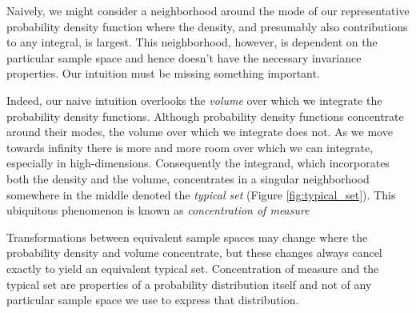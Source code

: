 Naively, we might consider a neighborhood around the mode of our 
representative probability density function where the density, and 
presumably also contributions to any integral, is largest.  This
neighborhood, however, is dependent on the particular sample
space and hence doesn't have the necessary invariance properties.
Our intuition must be missing something important.

Indeed, our naive intuition overlooks the \emph{volume} over which 
we integrate the probability density functions.  Although probability 
density functions concentrate around their modes, the volume over which
we integrate does not.  As we move towards infinity there is more and
more room over which we can integrate, especially in high-dimensions.
Consequently the integrand, which incorporates both the density and the volume, 
concentrates in a singular neighborhood somewhere in the  middle denoted 
the \emph{typical set} (Figure \ref{fig:typical_set}).  This ubiquitous phenomenon 
is known as \emph{concentration of measure}

\begin{figure*}
\centering
{}
\caption{On high-dimensional samples spaces all well-behaved probability 
distributions concentrate in a neighborhood called the \emph{typical set}.  
In order to estimate the integrals needed to compute probabilities and 
expectations we have to be able to identify where the typical set lies in 
the sample space, which is a challenging task.
}
\label{fig:typical_set}
\end{figure*}

Transformations between equivalent sample spaces may change where 
the probability density and volume concentrate, but these changes always 
cancel exactly to yield an equivalent typical set.  Concentration of measure 
and the typical set are properties of a probability distribution itself and not 
of any particular sample space we use to express that distribution.

